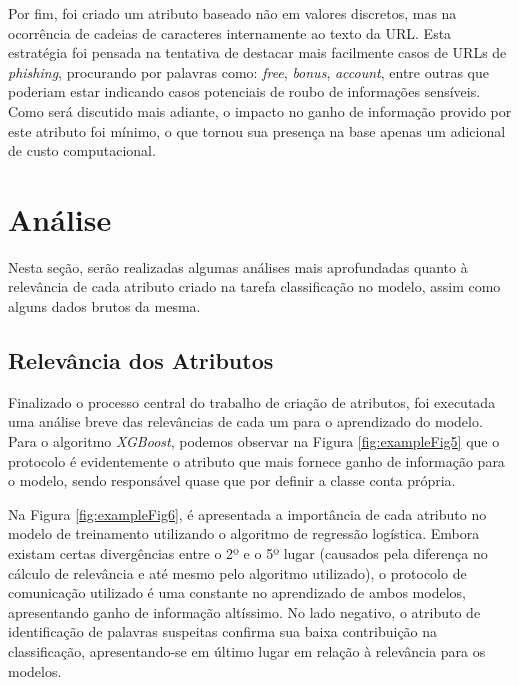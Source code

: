 \documentclass[a4paper, 12pt]{article}
\begin{document}
Por fim, foi criado um atributo baseado não em valores discretos, mas na ocorrência de cadeias de caracteres internamente ao texto da URL. Esta estratégia foi pensada na tentativa de destacar mais facilmente casos de URLs de \emph{phishing}, procurando por palavras como: \emph{free}, \emph{bonus}, \emph{account}, entre outras que poderiam estar indicando casos potenciais de roubo de informações sensíveis. Como será discutido mais adiante, o impacto no ganho de informação provido por este atributo foi mínimo, o que tornou sua presença na base apenas um adicional de custo computacional.

\section{Análise}

Nesta seção, serão realizadas algumas análises mais aprofundadas quanto à relevância de cada atributo criado na tarefa classificação no modelo, assim como alguns dados brutos da mesma.

\subsection{Relevância dos Atributos}

Finalizado o processo central do trabalho de criação de atributos, foi executada uma análise breve das relevâncias de cada um para o aprendizado do modelo. Para o algoritmo \emph{XGBoost}, podemos observar na Figura \ref{fig:exampleFig5} que o protocolo é evidentemente o atributo que mais fornece ganho de informação para o modelo, sendo responsável quase que por definir a classe conta própria.

Na Figura \ref{fig:exampleFig6}, é apresentada a importância de cada atributo no modelo de treinamento utilizando o algoritmo de regressão logística. Embora existam certas divergências entre o 2º e o 5º lugar (causados pela diferença no cálculo de relevância e até mesmo pelo algoritmo utilizado), o protocolo de comunicação utilizado é uma constante no aprendizado de ambos modelos, apresentando ganho de informação altíssimo. No lado negativo, o atributo de identificação de palavras suspeitas confirma sua baixa contribuição na classificação, apresentando-se em último lugar em relação à relevância para os modelos.
\end{document}
